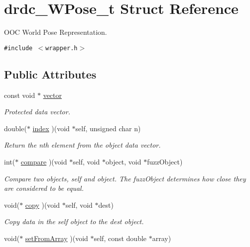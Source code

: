 \hypertarget{structdrdc__WPose__t}{
\section{drdc\_\-WPose\_\-t Struct Reference}
\label{structdrdc__WPose__t}
}
OOC World Pose Representation.  


{\tt \#include $<$wrapper.h$>$}

\subsection*{Public Attributes}
\begin{CompactItemize}
\item 
const void $\ast$ \hyperlink{structdrdc__WPose__t_ee8bf5ed85771fb17a81ad4aa337655c}{vector}
\begin{CompactList}\small\item\em Protected data vector. \item\end{CompactList}\item 
double($\ast$ \hyperlink{structdrdc__WPose__t_da90532e6b28a4e0858b920649b6bc60}{index} )(void $\ast$self, unsigned char n)
\begin{CompactList}\small\item\em Return the nth element from the object data vector. \item\end{CompactList}\item 
int($\ast$ \hyperlink{structdrdc__WPose__t_99b866961db8996097b6febfc6dad41e}{compare} )(void $\ast$self, void $\ast$object, void $\ast$fuzzObject)
\begin{CompactList}\small\item\em Compare two objects, self and object. The fuzzObject determines how close they are considered to be equal. \item\end{CompactList}\item 
void($\ast$ \hyperlink{structdrdc__WPose__t_47a1b48fdc344f82d3d3597c93b41ed5}{copy} )(void $\ast$self, void $\ast$dest)
\begin{CompactList}\small\item\em Copy data in the self object to the dest object. \item\end{CompactList}\item 
void($\ast$ \hyperlink{structdrdc__WPose__t_a41798cf029e6d51ccc7ef79c2bf3f6f}{setFromArray} )(void $\ast$self, const double $\ast$array)

\end{CompactItemize}
